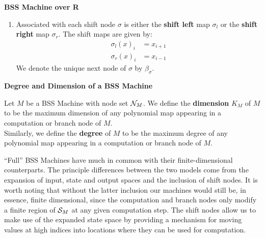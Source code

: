 \begin{definition}{\textbf{BSS Machine over R}}
\begin{enumerate}
    \item Associated with each shift node $\sigma$ is either the
      \textbf{shift left} map $\sigma_l$ or the \textbf{shift right}
      map $\sigma_r$.  The shift maps are given by:
      \begin{align*}
        \sigma_l(x)_i &= x_{i+1}\\
        \sigma_r(x)_i &= x_{i-1}
      \end{align*}
      We denote the unique next node of $\sigma$ by
      $\beta_\sigma$. 
    \end{enumerate}
  \end{definition}

  \begin{definition}{\textbf{Degree and Dimension of a BSS Machine}}
    
    Let $M$ be a BSS Machine with node set $\mathcal{N}_M$.  We define the
    \textbf{dimension} $K_M$ of $M$ to be the maximum dimension of any
    polynomial map appearing in a computation or branch node of $M$.\\
    
    Similarly, we define the \textbf{degree} of $M$ to be the maximum
    degree of any polynomial map appearing in a computation or branch
    node of $M$.
    
  \end{definition}

  ``Full'' BSS Machines have much in common with their
  finite-dimensional counterparts.  The principle differences between
  the two models come from the expansion of input, state and output
  spaces and the inclusion of shift nodes.  It is worth noting that
  without the latter inclusion our machines would still be, in
  essence, finite dimensional, since the computation and branch nodes
  only modify a finite region of $\mathcal{S}_M$ at any given
  computation step.  The shift nodes allow us to make use of the
  expanded state space by providing a mechanism for moving values at
  high indices into locations where they can be used for computation.

